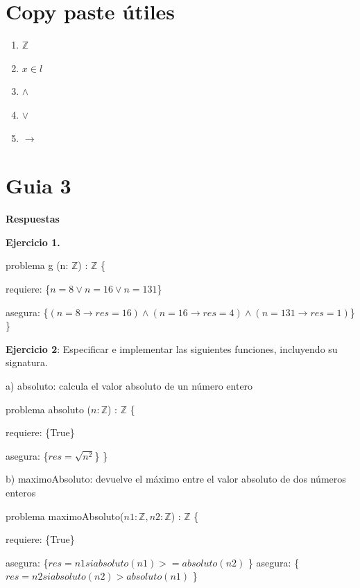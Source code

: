 \documentclass{article}
\begin{document}
\section{Copy paste útiles}

\begin{enumerate}
\item{$\mathbb{Z}$}
\item $x \in l$ 
\item $\wedge$
\item $\vee$
\item $\rightarrow$
\end{enumerate}

\section{Guia 3}

\textbf{Respuestas}\newline

\textbf{Ejercicio 1.}\newline

problema g (n: $\mathbb{Z}$) : $\mathbb{Z}$ \{

    \qquad requiere: \{$n=8 \vee n = 16 \vee n = 131$\}
    
    asegura: \{$(n=8 \rightarrow res = 16) \wedge (n=16 \rightarrow res = 4) \wedge (n=131 \rightarrow res = 1)$\}
\}\newline


\textbf{Ejercicio 2}: Especificar e implementar las siguientes funciones, incluyendo su signatura.\newline


a) absoluto: calcula el valor absoluto de un número entero\newline


problema absoluto ($n: \mathbb{Z}$) : $\mathbb{Z}$ \{

    \qquad requiere: \{True\}

    asegura: \{$res = \sqrt{n^2}$\}
    \}\newline

b) maximoAbsoluto: devuelve el máximo entre el valor absoluto de dos números enteros\newline


problema maximoAbsoluto($n1: \mathbb{Z}, n2: \mathbb{Z}$) : $\mathbb{Z}$ \{

    \qquad requiere: \{True\}

    asegura: \{$res = n1 si absoluto(n1) >= absoluto(n2)$ \}
    asegura: \{$res = n2 si absoluto(n2) > absoluto(n1)$ \}
\end{document}
